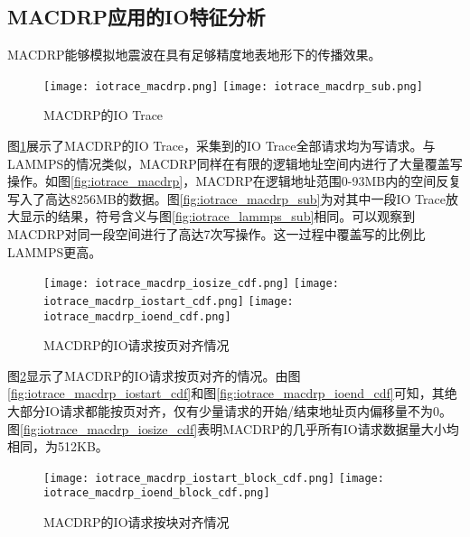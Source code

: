 \subsection{MACDRP应用的IO特征分析}
\label{ssc:ioana}
MACDRP能够模拟地震波在具有足够精度地表地形下的传播效果。
\begin{figure}[H]
  \centering
    {\texttt{[image: iotrace\_macdrp.png]}}
  \hspace{4em}
      {\texttt{[image: iotrace\_macdrp\_sub.png]}}
  \caption{MACDRP的IO Trace}
  \label{fig:iotrace_macdrp_all}
\end{figure}
图\ref{fig:iotrace_macdrp_all}展示了MACDRP的IO Trace，采集到的IO Trace全部请求均为写请求。与LAMMPS的情况类似，MACDRP同样在有限的逻辑地址空间内进行了大量覆盖写操作。如图\ref{fig:iotrace_macdrp}，MACDRP在逻辑地址范围0-93MB内的空间反复写入了高达8256MB的数据。图\ref{fig:iotrace_macdrp_sub}为对其中一段IO Trace放大显示的结果，符号含义与图\ref{fig:iotrace_lammps_sub}相同。可以观察到MACDRP对同一段空间进行了高达7次写操作。这一过程中覆盖写的比例比LAMMPS更高。

\begin{figure}[H]
  \centering
    {\texttt{[image: iotrace\_macdrp\_iosize\_cdf.png]}}
  \hspace{1em}
      {\texttt{[image: iotrace\_macdrp\_iostart\_cdf.png]}}
      \hspace{1em}
          {\texttt{[image: iotrace\_macdrp\_ioend\_cdf.png]}}
  \caption{MACDRP的IO请求按页对齐情况}
  \label{fig:iotrace_macdrp_iocdf}
\end{figure}

图\ref{fig:iotrace_macdrp_iocdf}显示了MACDRP的IO请求按页对齐的情况。由图\ref{fig:iotrace_macdrp_iostart_cdf}和图\ref{fig:iotrace_macdrp_ioend_cdf}可知，其绝大部分IO请求都能按页对齐，仅有少量请求的开始/结束地址页内偏移量不为0。图\ref{fig:iotrace_macdrp_iosize_cdf}表明MACDRP的几乎所有IO请求数据量大小均相同，为512KB。

\begin{figure}[H]
  \centering
      {\texttt{[image: iotrace\_macdrp\_iostart\_block\_cdf.png]}}
      \hspace{1em}
          {\texttt{[image: iotrace\_macdrp\_ioend\_block\_cdf.png]}}
  \caption{MACDRP的IO请求按块对齐情况}
  \label{fig:iotrace_macdrp_iocdf_block}
\end{figure}

